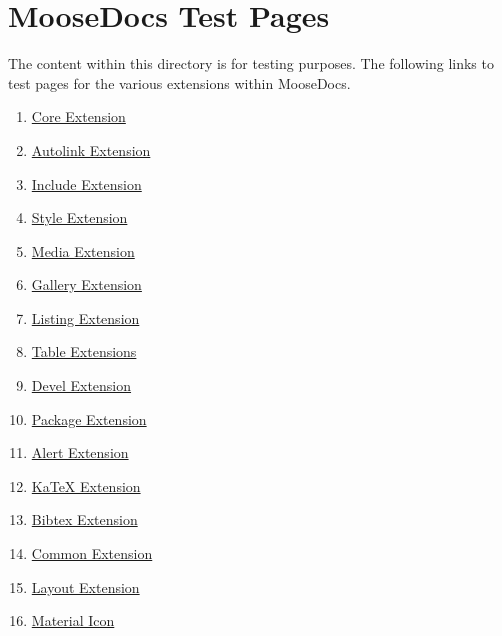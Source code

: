 
\part{\label{moosedocs-test-pages}MooseDocs Test Pages}
\par The content within this directory is for testing purposes. The following links to test pages for the various extensions within MooseDocs.
\begin{enumerate}
\item 
\par \hyperref[core-extension]{Core Extension} 
\item 
\par \hyperref[autolink-extension]{Autolink Extension} 
\item 
\par \hyperref[include-extension]{Include Extension} 
\item 
\par \hyperref[style-extension]{Style Extension} 
\item 
\par \hyperref[media-extension]{Media Extension} 
\item 
\par \hyperref[gallery-extension]{Gallery Extension} 
\item 
\par \hyperref[listing-extension]{Listing Extension} 
\item 
\par \hyperref[table-extensions]{Table Extensions} 
\item 
\par \hyperref[devel-extension]{Devel Extension} 
\item 
\par \hyperref[package-extension]{Package Extension} 
\item 
\par \hyperref[alert-extension]{Alert Extension} 
\item 
\par \hyperref[katex-extension]{KaTeX Extension} 
\item 
\par \hyperref[bibtex-extension]{Bibtex Extension} 
\item 
\par \hyperref[common-extension]{Common Extension} 
\item 
\par \hyperref[layout-extension]{Layout Extension} 
\item 
\par \hyperref[material-icon]{Material Icon} 

\end{enumerate}
